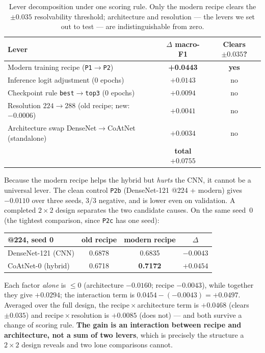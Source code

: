 \documentclass[11pt,a4paper]{article}
\newcommand{\macroF}{\textup{macro-F1}}   %
\begin{document}
\begin{table}[t]
\centering
\caption{Lever decomposition under one scoring rule. Only the modern recipe
clears the $\pm0.035$ resolvability threshold; architecture and resolution ---
the levers we set out to test --- are indistinguishable from zero.}
\label{tab:decomp}
\begin{tabular}{l c c}
\toprule
Lever & $\Delta$ \macroF{} & Clears $\pm0.035$? \\
\midrule
Modern training recipe (\texttt{P1}$\to$\texttt{P2}) & \textbf{+0.0443} & \textbf{yes} \\
Inference logit adjustment (0 epochs)                & $+0.0143$ & no \\
Checkpoint rule \texttt{best}$\to$\texttt{top3} (0 epochs) & $+0.0094$ & no \\
Resolution $224\to288$ (old recipe; new: $-0.0006$)  & $+0.0041$ & no \\
Architecture swap DenseNet$\to$CoAtNet (standalone)  & $+0.0034$ & no \\
\midrule
& \textbf{total $+0.0755$} & \\
\bottomrule
\end{tabular}
\end{table}

Because the modern recipe helps the hybrid but \emph{hurts} the CNN, it cannot
be a universal lever. The clean control \texttt{P2b} (DenseNet-121 @224 +
modern) gives $-0.0110$ over three seeds, 3/3 negative, and is lower even on
validation. A completed $2{\times}2$ design separates the two candidate causes.
On the same seed~0 (the tightest comparison, since \texttt{P2c} has one seed):
\begin{center}\small
\begin{tabular}{l c c c}
\toprule
@224, seed 0 & old recipe & modern recipe & $\Delta$ \\
\midrule
DenseNet-121 (CNN)   & 0.6878 & 0.6835 & $-0.0043$ \\
CoAtNet-0 (hybrid)   & 0.6718 & \textbf{0.7172} & $+0.0454$ \\
\bottomrule
\end{tabular}
\end{center}
Each factor \emph{alone} is $\le0$ (architecture $-0.0160$; recipe $-0.0043$),
while together they give $+0.0294$; the interaction term is
$0.0454-(-0.0043)=+0.0497$. Averaged over the full design, the
recipe\,$\times$\,architecture term is $\mathbf{+0.0468}$ (clears $\pm0.035$)
and recipe\,$\times$\,resolution is $+0.0085$ (does not) --- and both survive a
change of scoring rule. \textbf{The gain is an interaction between recipe and
architecture, not a sum of two levers}, which is precisely the structure a
$2{\times}2$ design reveals and two lone comparisons cannot.
\end{document}
